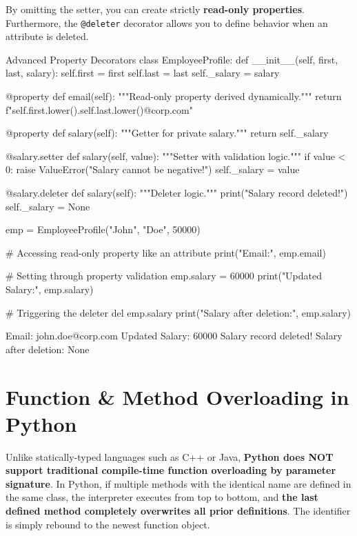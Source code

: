 By omitting the setter, you can create strictly \textbf{read-only properties}. Furthermore, the \texttt{@deleter} decorator allows you to define behavior when an attribute is deleted.

\begin{pythoncode}{Advanced Property Decorators}
class EmployeeProfile:
    def __init__(self, first, last, salary):
        self.first = first
        self.last = last
        self._salary = salary
        
    @property
    def email(self):
        """Read-only property derived dynamically."""
        return f"{self.first.lower()}.{self.last.lower()}@corp.com"
        
    @property
    def salary(self):
        """Getter for private salary."""
        return self._salary
        
    @salary.setter
    def salary(self, value):
        """Setter with validation logic."""
        if value < 0:
            raise ValueError("Salary cannot be negative!")
        self._salary = value
        
    @salary.deleter
    def salary(self):
        """Deleter logic."""
        print("Salary record deleted!")
        self._salary = None

emp = EmployeeProfile("John", "Doe", 50000)

# Accessing read-only property like an attribute
print("Email:", emp.email)

# Setting through property validation
emp.salary = 60000 
print("Updated Salary:", emp.salary)

# Triggering the deleter
del emp.salary
print("Salary after deletion:", emp.salary)
\end{pythoncode}

\begin{outputbox}
Email: john.doe@corp.com
Updated Salary: 60000
Salary record deleted!
Salary after deletion: None
\end{outputbox}

\section{Function \& Method Overloading in Python}

\begin{conceptbox}
Unlike statically-typed languages such as C++ or Java, \textbf{Python does NOT support traditional compile-time function overloading by parameter signature}. In Python, if multiple methods with the identical name are defined in the same class, the interpreter executes from top to bottom, and \textbf{the last defined method completely overwrites all prior definitions}. The identifier is simply rebound to the newest function object.
\end{conceptbox}

